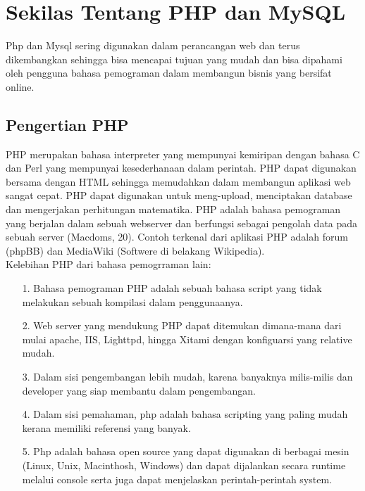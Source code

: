 \documentclass{jtetiproposalskripsi}
\begin{document}
\section{Sekilas Tentang PHP dan MySQL}
Php dan Mysql sering digunakan dalam perancangan web dan terus  dikembangkan sehingga bisa mencapai tujuan yang mudah dan bisa dipahami oleh pengguna bahasa pemograman dalam membangun bisnis yang bersifat online.
\subsection{Pengertian PHP}
PHP  merupakan  bahasa  interpreter  yang  mempunyai  kemiripan  dengan bahasa C dan Perl yang mempunyai kesederhanaan dalam perintah. PHP dapat digunakan bersama dengan HTML sehingga memudahkan dalam membangun aplikasi web sangat cepat. PHP dapat digunakan untuk meng-upload, menciptakan database dan mengerjakan perhitungan matematika. PHP adalah bahasa pemograman yang berjalan dalam sebuah webserver dan berfungsi sebagai pengolah data pada sebuah server (Macdoms, 20). Contoh terkenal dari aplikasi PHP adalah forum (phpBB) dan MediaWiki (Softwere di belakang Wikipedia).
\\
Kelebihan PHP dari bahasa pemogrraman lain:
\begin{itemize}
\item[1.]Bahasa  pemograman  PHP  adalah  sebuah  bahasa  script  yang  tidak melakukan sebuah kompilasi dalam penggunaanya.
\item[2.]Web server yang mendukung PHP dapat ditemukan dimana-mana dari mulai apache, IIS, Lighttpd, hingga Xitami dengan konfiguarsi yang relative mudah.
\item[3.]Dalam sisi pengembangan lebih mudah, karena banyaknya milis-milis dan developer yang siap membantu dalam pengembangan.
\item[4.]Dalam sisi pemahaman, php adalah bahasa scripting yang paling mudah kerana memiliki referensi yang banyak.
\item[5.]Php adalah bahasa open source yang dapat digunakan di berbagai mesin (Linux,  Unix,  Macinthosh,  Windows)  dan  dapat  dijalankan  secara runtime melalui console serta juga dapat menjelaskan perintah-perintah system.
\end{itemize} 
\end{document}
